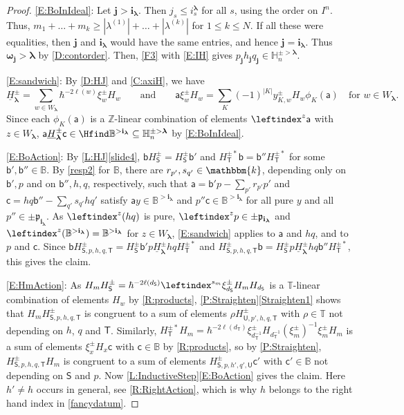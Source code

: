 \documentclass[a4paper,11pt]{amsart}
\newcommand\blam{{\boldsymbol\lambda}}
\newcommand\bom{{\boldsymbol\omega}}
\newcommand\bi{\mathbf{i}}
\newcommand\bj{\mathbf{j}}
\newcommand\ilam[1][\blam]{\bi_{#1}}
\numberwithin{equation}{subsection}
\theoremstyle{definition}
\theoremstyle{theorem}
\theoremstyle{remark}
\newcommand\plam[1][\lambda]{\mathfrak{p}_{#1}}
\newcommand\HH{\mathbb{H}}
\newcommand\HJpm{\underline{H}^\pm}
\newcommand\Sym{W}
\newcommand\xipm{\xi^\pm}
\newcommand\ba{\mathsf{a}}
\newcommand\bb{\mathsf{b}}
\newcommand\bc{\mathsf{c}}
\newcommand\bS{{\mathsf{S}}}
\newcommand\bT{{\mathsf{T}}}
\newcommand\bU{{\mathsf{U}}}
\newcommand\kk{\mathbbm{k}}
\newcommand\Z{\mathbb{Z}}
\newcommand\Tos{\mathbb{T}}
\newcommand{\Bo}{\mathbb{B}}
\begin{document}
\begin{proof}
  \autoref{E:BoInIdeal}: Let $\bj>\ilam$. Then $j_s\le i^\blam_s$ for all $s$, using the order on $I^n$. Thus,  $m_1+\dots+m_k\ge|\lambda^{(1)}|+\dots+|\lambda^{(k)}|$ for $1\le k\le N$.
  If all these were equalities, then $\bj$ and $\ilam$ would have the same entries, and hence
  $\bj=\ilam$. Thus $\bom_\bj>\blam$ by \autoref{D:contorder}. Then, \autoref{F3} with
  \autoref{E:IH} gives $p_\bj h_\bj q_\bj\in\HH^{\pm>\blam}_n$.

  \autoref{E:sandwich}: By \autoref{D:HJ} and \autoref{C:axiH}, we have
  \[
    \HJpm_\blam=\sum_{w\in\Sym_\blam}\hbar^{-2\ell(w)}\xipm_wH_w\qquad\text{and}\qquad
    \ba\xipm_wH_w=\sum_{K}(-1)^{|K|}y^\pm_{K,w}H_w\phi_{K}(\ba)\quad\text{for }w\in\Sym_\blam.
  \]
  Since each $\phi_{K}(\ba)$ is a $\Z$-linear combination of elements $\leftindex^z{\ba}$ with $z\in\Sym_\blam$,
  $\ba\HJpm_\blam\bc\in\Hfind\Bo^{>\ilam}\subseteq\HH^{\pm>\blam}_n$ by
  \autoref{E:BoInIdeal}.

  \autoref{E:BoAction}: By \autoref{L:HJ}\autoref{slide4}, $\bb H^\pm_\bS=H^\pm_\bS\bb'$ and
  $H^{\pm*}_\bT\bb=\bb''H^{\pm*}_\bT$ for some $\bb',\bb''\in\Bo$. By \autoref{resp2} for $\Bo$, there
  are $r_{p'},s_{q'}\in\kk$, depending only on $\bb',p$ and on $\bb'',h,q$, respectively, such that
  $\ba=\bb'p-\sum_{p'}r_{p'}p'$ and $\bc=hq\bb''-\sum_{q'}s_{q'}hq'$ satisfy $\ba y\in\Bo^{>\ilam}$
  and $p''\bc\in\Bo^{>\ilam}$ for all pure $y$ and all $p''\in\pm\plam[\ilam]$. As
  $\leftindex^z{(hq)}$ is pure, $\leftindex^zp\in\pm\plam[\ilam]$ and
  $\leftindex^z{(\Bo^{>\ilam})}=\Bo^{>\ilam}$ for $z\in\Sym_\blam$, \autoref{E:sandwich} applies to $\ba$ and $hq$, and to $p$ and $\bc$. Since
  $\bb H^\pm_{\bS,p,h,q,\bT}=H^\pm_\bS\bb'p\HJpm_\blam hqH^{\pm*}_\bT$ and
  $H^\pm_{\bS,p,h,q,\bT}\bb=H^\pm_\bS p\HJpm_\blam hq\bb''H^{\pm*}_\bT$, this gives the claim.

  \autoref{E:HmAction}: As $H_mH^\pm_\bS=\hbar^{-2\ell(d_\bS)}\leftindex^{s_m}{{\xipm_{d_\bS}}}H_mH_{d_\bS}$
  is a $\Tos$-linear combination of elements $H_w$ by \autoref{R:products},
  \autoref{P:Straighten}\autoref{Straighten1} shows that $H_mH^\pm_{\bS,p,h,q,\bT}$ is congruent to a
  sum of elements $\rho H^\pm_{\bU,p',h,q,\bT}$ with $\rho\in\Tos$ not depending on $h$, $q$ and $\bT$.
  Similarly, $H^{\pm*}_\bT H_m=\hbar^{-2\ell(d_\bT)}\xipm_{d_\bT^{-1}}H_{d_\bT^{-1}}(\xipm_m)^{-1}\xipm_mH_m$
  is a sum of elements $\xipm_xH_x\bc$ with $\bc\in\Bo$ by \autoref{R:products}, so by
  \autoref{P:Straighten}, $H^\pm_{\bS,p,h,q,\bT}H_m$ is congruent to a sum of elements
  $H^\pm_{\bS,p,h',q',\bU}\bc'$ with $\bc'\in\Bo$ not depending on $\bS$ and $p$. Now
  \autoref{L:InductiveStep}\autoref{E:BoAction} gives the claim. Here $h'\ne h$ occurs in general, see
  \autoref{R:RightAction}, which is why $h$ belongs to the right hand index in \autoref{fancydatum}.
\end{proof}
\end{document}
